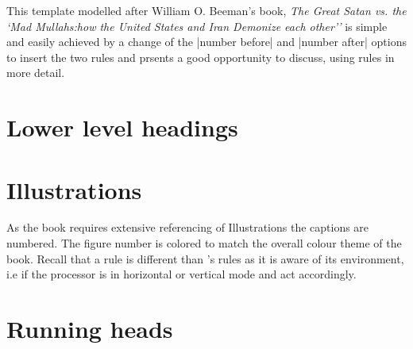 \thispagestyle{plain}
\begin{multicols}{2}
This template modelled after William O. Beeman’s book, \emph{The Great Satan vs. the `Mad Mullahs:how the United States and Iran Demonize each other’’} is simple and easily achieved by a change of the |number before| and |number after| options to insert the two rules and prsents a good opportunity to discuss, using \latexe rules in more detail.



\bgroup%
\centering
\fboxsep-1pt

\egroup

\section{Lower level headings}
\lipsum[1]

\section{Illustrations}

As the book requires extensive referencing of Illustrations the captions are numbered. The figure number is colored to match the overall colour theme of the book.
Recall that a \latexe rule is different than \tex’s rules as it is aware of its environment, i.e if the \tex processor is in horizontal or vertical mode and act accordingly.


\section{Running heads}

\lipsum[2-3]

\end{multicols}